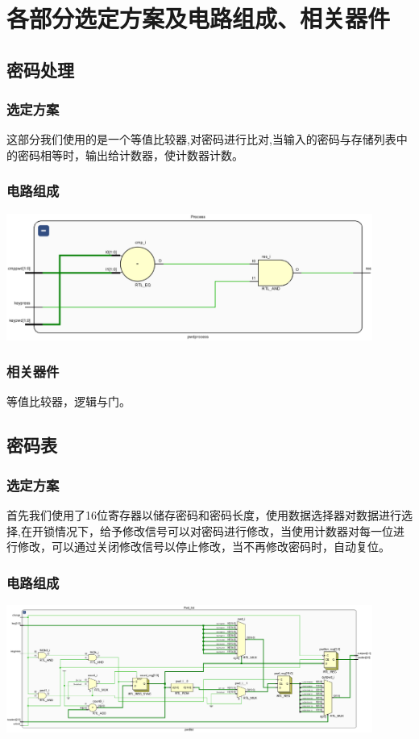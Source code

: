 \documentclass[a4paper,11pt]{ctexart}
\begin{document}
\section{各部分选定方案及电路组成、相关器件}
\subsection{密码处理}
\subsubsection{选定方案}这部分我们使用的是一个等值比较器,对密码进行比对,当输入的密码与存储列表中的密码相等时，输出给计数器，使计数器计数。
\subsubsection{电路组成}\includegraphics[width = 0.9\textwidth]{./images/ProcessRTL.eps}
\subsubsection{相关器件}等值比较器，逻辑与门。

\subsection{密码表}
\subsubsection{选定方案}首先我们使用了16位寄存器以储存密码和密码长度，使用数据选择器对数据进行选择,在开锁情况下，给予修改信号可以对密码进行修改，当使用计数器对每一位进行修改，可以通过关闭修改信号以停止修改，当不再修改密码时，自动复位。
\subsubsection{电路组成}\includegraphics[width = 0.9\textwidth]{./images/PwdlistRTL.eps}
\end{document}
